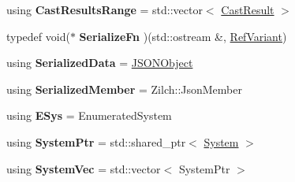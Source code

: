 \begin{DoxyCompactItemize}
\item 
\hypertarget{namespaceDCEngine_a28587c1e648189a674740273020f723d}{using {\bfseries Cast\-Results\-Range} = std\-::vector$<$ \hyperlink{structDCEngine_1_1CastResult}{Cast\-Result} $>$}\label{namespaceDCEngine_a28587c1e648189a674740273020f723d}

\item 
\hypertarget{namespaceDCEngine_a3c2b6c803011b04b6caf39aa836916a0}{typedef void($\ast$ {\bfseries Serialize\-Fn} )(std\-::ostream \&, \hyperlink{classDCEngine_1_1RefVariant}{Ref\-Variant})}\label{namespaceDCEngine_a3c2b6c803011b04b6caf39aa836916a0}

\item 
\hypertarget{namespaceDCEngine_a6f9fa45b47ba545847dce453b9b5c5b5}{using {\bfseries Serialized\-Data} = \hyperlink{classDCEngine_1_1JSONObject}{J\-S\-O\-N\-Object}}\label{namespaceDCEngine_a6f9fa45b47ba545847dce453b9b5c5b5}

\item 
\hypertarget{namespaceDCEngine_a982ad8b48b014d194a9bfdd4dd75a6f1}{using {\bfseries Serialized\-Member} = Zilch\-::\-Json\-Member}\label{namespaceDCEngine_a982ad8b48b014d194a9bfdd4dd75a6f1}

\item 
\hypertarget{namespaceDCEngine_a396ae49846fea65f7a97616600233c5e}{using {\bfseries E\-Sys} = Enumerated\-System}\label{namespaceDCEngine_a396ae49846fea65f7a97616600233c5e}

\item 
\hypertarget{namespaceDCEngine_a768b682449db5128155afda362871943}{using {\bfseries System\-Ptr} = std\-::shared\-\_\-ptr$<$ \hyperlink{classDCEngine_1_1System}{System} $>$}\label{namespaceDCEngine_a768b682449db5128155afda362871943}

\item 
\hypertarget{namespaceDCEngine_a285425049f043057862000e2a3cdeead}{using {\bfseries System\-Vec} = std\-::vector$<$ System\-Ptr $>$}\label{namespaceDCEngine_a285425049f043057862000e2a3cdeead}

\end{DoxyCompactItemize}
